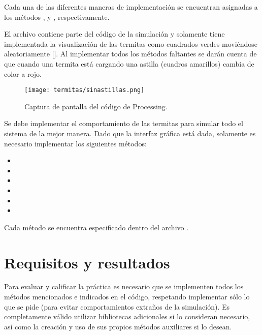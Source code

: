 Cada una de las diferentes maneras de implementación se encuentran asignadas a los métodos ,  y , respectivamente.

El archivo  contiene parte del código de la simulación y solamente tiene implementada la visualización de las termitas como cuadrados verdes moviéndose aleatoriamente []. Al implementar todos los métodos faltantes se darán cuenta de que cuando una termita está cargando una astilla (cuadros amarillos) cambia de color a rojo.


\begin{figure}
  \centering
  \texttt{[image: termitas/sinastillas.png]}
  \caption{Captura de pantalla del código  de Processing.}
  \label{fig:sinastillas}
\end{figure}

Se debe implementar el comportamiento de las termitas para simular todo el sistema de la mejor manera. Dado que la interfaz gráfica está dada, solamente es necesario implementar los siguientes métodos:

\begin{itemize}
  \item {}
  \item {}
  \item {}
  \item {}
  \item {}
  \item {}
\end{itemize}

Cada método se encuentra especificado dentro del archivo .


\section{Requisitos y resultados}

Para evaluar y calificar la práctica es necesario que se implementen todos los métodos mencionados e indicados en el código, respetando implementar sólo lo que se pide (para evitar comportamientos extraños de la simulación).
Es completamente válido utilizar bibliotecas adicionales si lo consideran necesario, así como la creación y uso de sus propios métodos auxiliares si lo desean.

